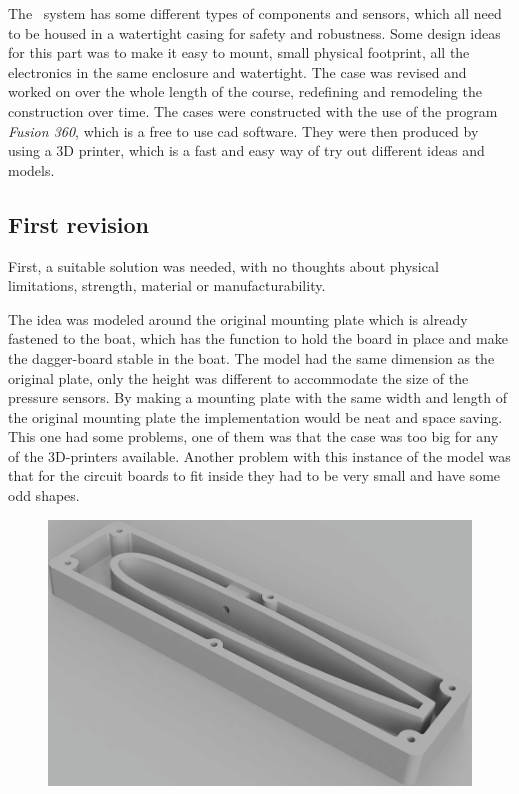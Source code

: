 
The \project~system has some different types of components and sensors, which all need to be housed in a watertight casing for safety and robustness. Some design ideas for this part was to make it easy to mount, small physical footprint, all the electronics in the same enclosure and watertight.
The case was revised and worked on over the whole length of the course, redefining and remodeling the construction over time.
The cases were constructed with the use of the program \emph{Fusion 360}\cite{cad}, which is a free to use \gls{cad} software. They were then produced by using a 3D printer, which is a fast and easy way of try out different ideas and models.

\subsection{First revision}
First, a suitable solution was needed, with no thoughts about physical limitations, strength, material or manufacturability.

The idea was modeled around the original mounting plate which is already fastened to the boat, which has the function to hold the board in place and make the dagger-board stable in the boat. The model had the same dimension as the original plate, only the height was different to accommodate the size of the pressure sensors. By making a mounting plate with the same width and length of the original mounting plate the implementation would be neat and space saving.
This one had some problems, one of them was that the case was too big for any of the 3D-printers available. Another problem with this instance of the model was that for the circuit boards to fit inside they had to be very small and have some odd shapes.



\begin{figure}[H]
\begin{center}
	\includegraphics[width = .8\textwidth]{Figures/Case_rev_1.png}
	\label{Case_rev_1}
\end{center}
\end{figure}

